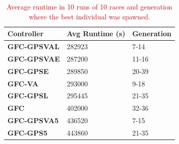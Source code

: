 \documentclass[10pt,journal,compsoc]{IEEEtran}
\begin{document}
\begin{table}[!ht]
	\centering
	{\scriptsize
          \caption{\textcolor{red}{Average runtime in 10 runs of 10 races 
            and
                  generation where the best individual was spawned.}}
		\label{tab:time}
		\begin{tabular}{|p{2.85cm}|p{2.20cm}|p{1.65cm}|}
			\hline  
			Controller& \textbf{Avg Runtime (s)}&\textbf{Generation}\\
\hline
\hline 	 
 \textbf{{\sf GFC-GPSVAL}} \cite{DBLP:conf/cig/SalemMG19}& \cellcolor{red!25}282923
&\cellcolor{red!25}7-14\\	
\textbf{{\sf GFC-GPSVAE}}& \cellcolor{red!25}287200
&\cellcolor{red!25}11-16\\
 \textbf{{\sf GFC-GPSE}}&\cellcolor{red!25}	289850
&\cellcolor{red!25}20-39\\
\textbf{{\sf GFC-VA}} \cite{DBLP:conf/cig/SalemMG19}&\cellcolor{red!25}293000
&\cellcolor{red!25}9-18\\
 \textbf{{\sf GFC-GPSL}} \cite{DBLP:conf/cig/SalemMG19}& \cellcolor{red!25}295445
&\cellcolor{red!25}21-35\\
\textbf{\textbf{{\sf GFC}}} \cite{salem_cig2018}&\cellcolor{red!25}402000
                   &\cellcolor{red!25}32-36\\
\textbf{{\sf GFC-GPSVA5}} \cite{DBLP:conf/cig/SalemMG19}&\cellcolor{red!25}	436520
&\cellcolor{red!25}7-15\\	
	
 \textbf{{\sf GFC-GPS5}} \cite{DBLP:conf/cig/SalemMG19}&\cellcolor{red!25}443860
				&\cellcolor{red!25}21-35\\	
					
			\hline 
		
		\end{tabular}
		
	}
\end{table} 
\end{document}
